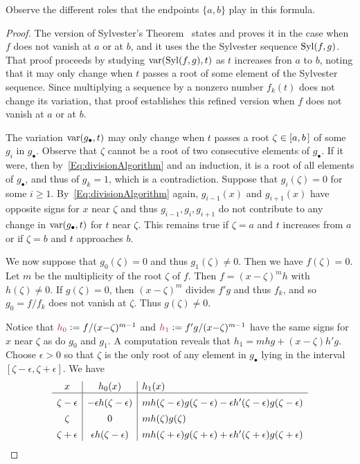 Observe the different roles that the endpoints $\{a,b\}$ play in this formula.

\begin{proof}
  The version of Sylvester's Theorem~\cite[Thm.\ 2.55]{BPR} states and proves it in the case 
  when $f$ does not vanish at $a$ or at $b$, and it uses the 
  the Sylvester sequence $\operatorname{{\rm Syl}}(f,g)$.
  That proof proceeds by studying $\operatorname{{\rm var}}(\operatorname{{\rm Syl}}(f,g), t)$ as $t$ increases fron $a$ to $b$, noting that it may only
  change when $t$ passes a root of some element of the Sylvester sequence.
  Since multiplying a sequence by a nonzero number $f_k(t)$ does not change its variation, that proof establishes this refined version
  when $f$ does not vanish at $a$ or at $b$.

  The variation $\operatorname{{\rm var}}(g_\bullet,t)$ may only change when $t$ passes a root $\zeta\in[a,b\hspace{.05cm}]$ of some $g_i$ in
  $g_\bullet$. 
  Observe that $\zeta$ cannot be a root of two consecutive elements of $g_\bullet$.
  If it were, then by~\eqref{Eq:divisionAlgorithm} and an induction, it is a root of all elements of $g_\bullet$, and thus of $g_k=1$, which is a
  contradiction.
  Suppose that $g_i(\zeta)=0$ for some $i\geq 1$.
  By~\eqref{Eq:divisionAlgorithm} again, $g_{i-1}(x)$ and $g_{i+1}(x)$ have opposite signs for $x$ near $\zeta$ and thus
  $g_{i-1},g_i,g_{i+1}$ do not contribute to any change in $\operatorname{{\rm var}}(g_\bullet,t)$ for $t$ near $\zeta$.
  This remains true if $\zeta=a$ and $t$ increases from $a$ or if $\zeta=b$ and $t$ approaches $b$.

  We now suppose that $g_0(\zeta)=0$ and thus $g_1(\zeta)\neq 0$.
  Then we have $f(\zeta)=0$.
  Let $m$ be the multiplicity of the root $\zeta$ of $f$.
  Then $f=(x{-}\zeta)^m h$ with $h(\zeta)\neq 0$.
  If $g(\zeta)=0$, then $(x{-}\zeta)^m$ divides $f'g$ and thus $f_k$, and so $g_0=f/f_k$ does not vanish at $\zeta$.
  Thus $g(\zeta)\neq 0$.

  Notice that $\defcolor{h_0}\vcentcolon=f/(x{-}\zeta)^{m-1}$ and $\defcolor{h_1}\vcentcolon=f'g/(x{-}\zeta)^{m-1}$ have the same signs for
  $x$ near $\zeta$ as do $g_0$ and $g_1$.
  A computation reveals that $h_1=mhg+(x{-}\zeta)h'g$. 
 Choose $\epsilon>0$ so that $\zeta$ is the only root of any element in $g_\bullet$ lying in the interval
 $[\zeta-\epsilon,\zeta+\epsilon]$.
 We have
 \[
 \begin{array}{c|c|l}
   x & h_0(x) & h_1(x)\\\hline
   \zeta-\epsilon & -\epsilon h(\zeta-\epsilon)  &
        mh(\zeta-\epsilon)g(\zeta-\epsilon) - \epsilon h'(\zeta-\epsilon)g(\zeta-\epsilon)  \rule{0pt}{13pt}\\
   \zeta     &     0    &   mh(\zeta)g(\zeta)  \rule{0pt}{13pt}\\
   \zeta+\epsilon & \epsilon h(\zeta-\epsilon)  &
        mh(\zeta+\epsilon)g(\zeta+\epsilon) + \epsilon h'(\zeta+\epsilon)g(\zeta+\epsilon)  \rule{0pt}{13pt}
 \end{array}
 \]
 

\end{proof}

